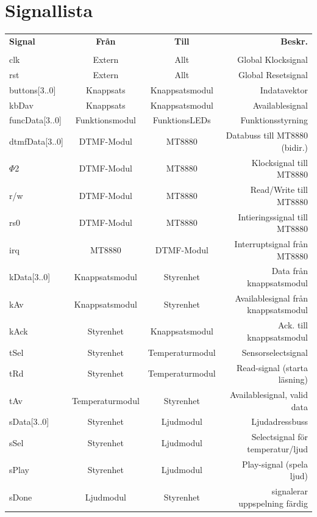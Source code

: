 \documentclass[a4paper,11pt]{article}
\begin{document}
	\section{Signallista}
	\begin{tabular}{l c c r}
		\\{\bf Signal} & {\bf Från} & {\bf Till} & {\bf Beskr.}\\ \\
		clk & Extern & Allt & Global Klocksignal\\
		rst & Extern & Allt & Global Resetsignal\\
		buttons[3..0] & Knappsats & Knappsatsmodul & Indatavektor\\
		kbDav & Knappsats & Knappsatsmodul & Availablesignal\\
		funcData[3..0] & Funktionsmodul & FunktionsLEDs & Funktionsstyrning\\
		dtmfData[3..0] & DTMF-Modul & MT8880 & Databuss till MT8880 (bidir.)\\
		\(\Phi\)2 & DTMF-Modul & MT8880 & Klocksignal till MT8880\\
		r/w & DTMF-Modul & MT8880 & Read/Write till MT8880\\
		rs0 & DTMF-Modul & MT8880 & Intieringssignal till MT8880\\
		irq & MT8880 & DTMF-Modul & Interruptsignal från MT8880\\

		kData[3..0] & Knappsatsmodul & Styrenhet & Data från knappsatsmodul\\
		kAv & Knappsatsmodul & Styrenhet & Availablesignal från knappsatsmodul\\
		kAck & Styrenhet & Knappsatsmodul & Ack. till knappsatsmodul\\

		tSel & Styrenhet & Temperaturmodul & Sensorselectsignal\\
		tRd & Styrenhet & Temperaturmodul & Read-signal (starta läsning)\\
		tAv & Temperaturmodul & Styrenhet & Availablesignal, valid data\\

		sData[3..0] & Styrenhet & Ljudmodul & Ljudadressbuss\\
		sSel & Styrenhet & Ljudmodul & Selectsignal för temperatur/ljud\\
		sPlay & Styrenhet & Ljudmodul & Play-signal (spela ljud)\\
		sDone & Ljudmodul & Styrenhet & signalerar uppspelning färdig\\


\end{tabular}
\end{document}
